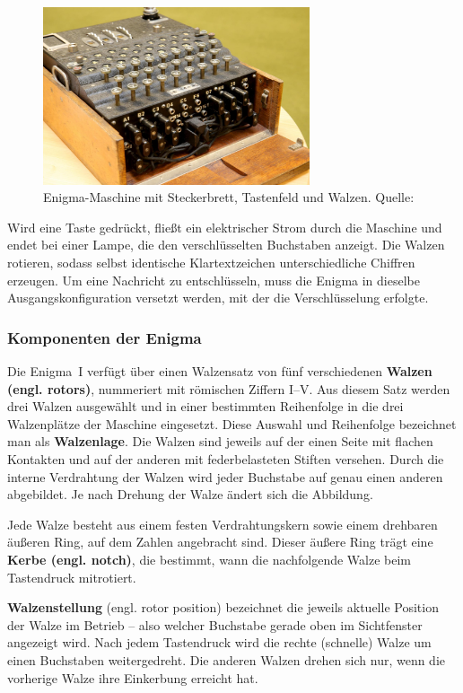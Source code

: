 \documentclass[12pt, ngerman, a4paper, numbers=noenddot]{article}
\begin{document}
\begin{figure}[H]
	\centering
	\includegraphics[width=0.7\textwidth]{bilder/enigma_stecker.jpg}
	\caption{Enigma-Maschine mit Steckerbrett, Tastenfeld und Walzen. Quelle: \cite{welt:enigma}}
	\label{fig:enigma_overview}
\end{figure}

Wird eine Taste gedrückt, fließt ein elektrischer Strom durch die Maschine und endet bei einer Lampe, die den verschlüsselten Buchstaben anzeigt. Die Walzen rotieren, sodass selbst identische Klartextzeichen unterschiedliche Chiffren erzeugen. Um eine Nachricht zu entschlüsseln, muss die Enigma in dieselbe Ausgangskonfiguration versetzt werden, mit der die Verschlüsselung erfolgte.


\newpage
\subsubsection{Komponenten der Enigma} 
Die Enigma~I verfügt über einen Walzensatz von fünf verschiedenen \textbf{Walzen (engl. rotors)}, nummeriert mit römischen Ziffern I–V. Aus diesem Satz werden drei Walzen ausgewählt und in einer bestimmten Reihenfolge in die drei Walzenplätze der Maschine eingesetzt. Diese Auswahl und Reihenfolge bezeichnet man als \textbf{Walzenlage}. Die Walzen sind jeweils auf der einen Seite mit flachen Kontakten und auf der anderen mit federbelasteten Stiften versehen. Durch die interne Verdrahtung der Walzen wird jeder Buchstabe auf genau einen anderen abgebildet. Je nach Drehung der Walze ändert sich die Abbildung.

Jede Walze besteht aus einem festen Verdrahtungskern sowie einem drehbaren äußeren Ring, auf dem Zahlen angebracht sind. Dieser äußere Ring trägt eine \textbf{Kerbe (engl. notch)}, die bestimmt, wann die nachfolgende Walze beim Tastendruck mitrotiert.

\textbf{Walzenstellung} (engl. rotor position) bezeichnet die jeweils aktuelle Position der Walze im Betrieb – also welcher Buchstabe gerade oben im Sichtfenster angezeigt wird. Nach jedem Tastendruck wird die rechte (schnelle) Walze um einen Buchstaben weitergedreht. Die anderen Walzen drehen sich nur, wenn die vorherige Walze ihre Einkerbung erreicht hat.  
\end{document}
